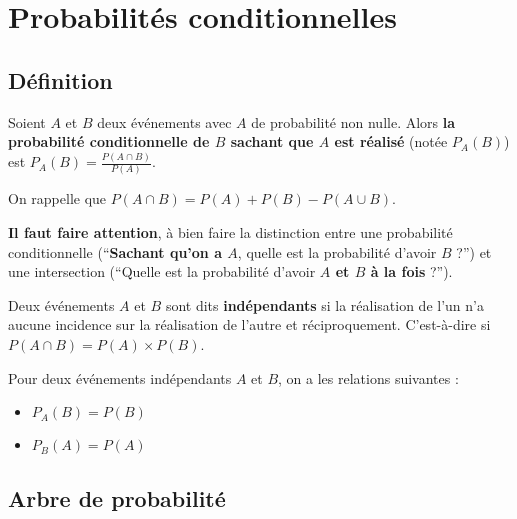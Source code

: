 


	
	\section{Probabilités conditionnelles}
	
	\subsection{Définition}
	
	\begin{formula}[Définition]
		Soient $A$ et $B$ deux événements avec $A$ de probabilité non nulle. Alors \textbf{la probabilité conditionnelle de $B$ sachant que $A$ est réalisé} (notée $P_{A}(B)$) est $\displaystyle{P_{A}(B) = \frac{P(A \cap B)}{P(A)}}$.
	\end{formula}
	
	\begin{tip}[Rappel]
		On rappelle que $P(A \cap B) = P(A) + P(B) - P(A \cup B)$.
	\end{tip}
	
	\begin{tip}
		\textbf{Il faut faire attention}, à bien faire la distinction entre une probabilité conditionnelle (``\textbf{Sachant qu'on a $A$}, quelle est la probabilité d'avoir $B$ ?'') et une intersection (``Quelle est la probabilité d'avoir \textbf{$A$ et $B$ à la fois} ?'').
	\end{tip}
	
	\begin{formula}[Indépendance]
		Deux événements $A$ et $B$ sont dits \textbf{indépendants} si la réalisation de l'un n'a aucune incidence sur la réalisation de l'autre et réciproquement. C'est-à-dire si $P(A \cap B) = P(A) \times P(B)$.
	\end{formula}
	
	\begin{formula}[Propriétés]
		Pour deux événements indépendants $A$ et $B$, on a les relations suivantes :
		\begin{itemize}
			\item $P_{A}(B) = P(B)$
			\item $P_{B}(A) = P(A)$
		\end{itemize}
	\end{formula}
	
	\subsection{Arbre de probabilité}
	
